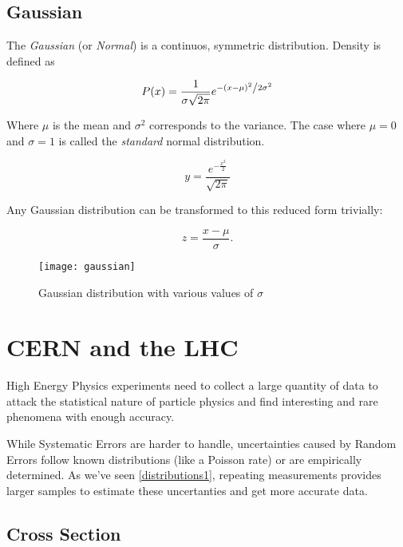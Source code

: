 \subsection{Gaussian}

The \textit{Gaussian} (or \textit{Normal}) is a continuos, symmetric distribution. Density is defined as

\begin{equation}
	P(x) = \frac{1}{{\sigma \sqrt {2\pi } }}e^{{{ - \left( {x - \mu } \right)^2 } \mathord{\left/ {\vphantom {{ - \left( {x - \mu } \right)^2 } {2\sigma ^2 }}} \right. \kern-\nulldelimiterspace} {2\sigma ^2 }}}
\end{equation}

Where $\mu$ is the mean and $\sigma ^2$ corresponds to the variance. The case where $\mu = 0$ and $\sigma = 1$ is called the \textit{standard} normal distribution.

\begin{equation}
	y = \frac{e^{ - \frac{{x^2 }}{2}}}{{\sqrt {2\pi } }}
\end{equation}

Any Gaussian distribution can be transformed to this reduced form trivially:

\begin{equation}
	z = \frac{x-\mu}{\sigma}.
\end{equation}

\begin{figure}
	\centerline{
		\texttt{[image: gaussian]}}
	\caption{Gaussian distribution with various values of $\sigma$ \cite{leo2012techniques}}
\end{figure}

\section{CERN and the LHC}

High Energy Physics experiments need to collect a large quantity of data to attack the statistical nature of particle physics and find interesting and rare phenomena with enough accuracy.

While Systematic Errors are harder to handle, uncertainties caused by Random Errors follow known distributions (like a Poisson rate) or are empirically determined. As we've seen \ref{distributions1}, repeating measurements provides larger samples to estimate these uncertanties and get more accurate data.

\subsection{Cross Section}

